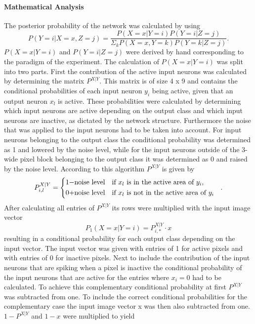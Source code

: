 \paragraph{Mathematical Analysis}
The posterior probability of the network was calculated by using
\begin{equation}
\label{eqn:pYvorausgesetztXUndZ}
P(Y = i|X = x, Z = j) = \frac{P(X=x|Y=i)P(Y = i|Z = j)}{\Sigma_{k}P(X=x,Y=k)P(Y=k|Z=j)}.
\end{equation}
$P(X=x|Y=i)$ and $P(Y=i|Z=j)$ were derived by hand corresponding to the paradigm of the experiment. The calculation of $P(X=x|Y=i)$ was split into two parts. First the contribution of the active input neurons was calculated by determining the matrix $P^{X|Y}$. This matrix is of size 4 x 9 and contains the conditional probabilities of each input neuron $y_i$ being active, given that an output neuron $x_l$ is active. These probabilities were calculated by determining which input neurons are active depending on the output class and which input neurons are inactive, as dictated by the network structure.  Furthermore the noise that was applied to the input neurons had to be taken into account. For input neurons belonging to the output class the conditional probability was determined as 1 and lowered by the noise level, while for the input neurons outside of the 3-wide pixel block belonging to the output class it was determined as 0 and raised by the noise level. According to this algorithm $P^{X|Y}$ is given by
\begin{equation}
\label{eqn:PXvorausgesetztYIf}
P_{i,l}^{X|Y} = \begin{dcases*} 1 - $noise level$ & if $x_l$ is in the active area of $y_i$, \\
0 + $noise level$ & \text{if $x_l$ is not in the active area of $ y_i $ } \end{dcases*}.\end{equation}
  After calculating all entries of $P^{X|Y}$ its rows were multiplied with the input image vector
\begin{equation}
\label{eqn:p1XvorausgesetztYMalX}
P_1(X = x|Y = i) = P^{X|Y}_{i,*} \cdot x
\end{equation}
resulting in a conditional probability for each output class depending on the input vector. The input vector was given with entries of 1 for active pixels and with entries of 0 for inactive pixels.
Next to include the contribution of the input neurons that are spiking when a pixel is inactive the conditional probability of the input neurons that are active for the entries where $x_i = 0$ had to be calculated. To achieve this complementary conditional probability at first $P^{X|Y}$ was subtracted from one. To include the correct conditional probabilities for the complementary case the input image vector x was then also subtracted from one. $1 - P^{X|Y}$ and $1 - x$ were multiplied to yield
